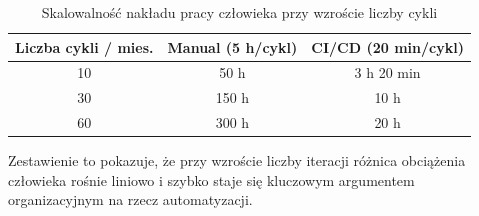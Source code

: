 \begin{table}[H]
\centering
\caption{Skalowalność nakładu pracy człowieka przy wzroście liczby cykli}
\label{tab:skalowalnosc-pracy}
\begin{tabular}{|c|c|c|}
\hline
\textbf{Liczba cykli / mies.} & \textbf{Manual (5 h/cykl)} & \textbf{CI/CD (20 min/cykl)} \\
\hline
10 & 50 h & 3 h 20 min \\
\hline
30 & 150 h & 10 h \\
\hline
60 & 300 h & 20 h \\
\hline
\end{tabular}
\end{table}

Zestawienie to pokazuje, że przy wzroście liczby iteracji różnica obciążenia człowieka rośnie liniowo i szybko staje się kluczowym argumentem organizacyjnym na rzecz automatyzacji.
